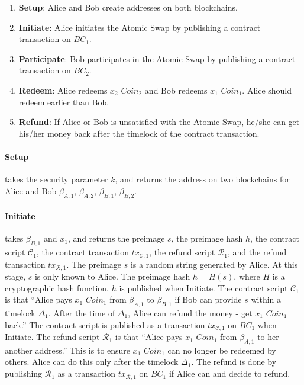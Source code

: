 \begin{enumerate}
    \item \textbf{Setup}: Alice and Bob create addresses on both blockchains.
    \item \textbf{Initiate}: Alice initiates the Atomic Swap by publishing a contract transaction on $BC_1$.
    \item \textbf{Participate}: Bob participates in the Atomic Swap by publishing a contract transaction on $BC_2$.
    \item \textbf{Redeem}: Alice redeems $x_2$ $Coin_2$ and Bob redeems $x_1$ $Coin_1$. Alice should redeem earlier than Bob.
    \item \textbf{Refund}: If Alice or Bob is unsatisfied with the Atomic Swap, he/she can get his/her money back after the timelock of the contract transaction.
\end{enumerate}

\paragraph{Setup}
takes the security parameter $k$,
and returns the address on two blockchains for Alice and Bob $\beta_{A, 1}$, $\beta_{A, 2}$, $\beta_{B, 1}$, $\beta_{B, 2}$.

\paragraph{Initiate}
takes $\beta_{B, 1}$ and $x_1$,
and returns the preimage $s$, the preimage hash $h$, the contract script $\mathcal{C}_1$, the contract transaction $tx_{\mathcal{C}, 1}$, the refund script $\mathcal{R}_1$, and the refund transaction $tx_{\mathcal{R}, 1}$.
The preimage $s$ is a random string generated by Alice. At this stage, $s$ is only known to Alice.
The preimage hash $h = H(s)$, where $H$ is a cryptographic hash function.  $h$ is published when Initiate.
The contract script $\mathcal{C}_1$ is that ``Alice pays $x_1$ $Coin_1$ from $\beta_{A, 1}$ to $\beta_{B, 1}$ if Bob can provide $s$ within a timelock $\Delta_1$. After the time of $\Delta_1$, Alice can refund the money - get $x_1$ $Coin_1$ back.''
The contract script is published as a transaction $tx_{\mathcal{C}, 1}$ on $BC_1$ when Initiate.
The refund script $\mathcal{R}_1$ is that ``Alice pays $x_1$ $Coin_1$ from $\beta_{A, 1}$ to her another address.'' This is to ensure $x_1$ $Coin_1$ can no longer be redeemed by others. Alice can do this only after the timelock $\Delta_1$.
The refund is done by publishing $\mathcal{R}_1$ as a transaction $tx_{\mathcal{R}, 1}$ on $BC_1$ if Alice can and decide to refund.

